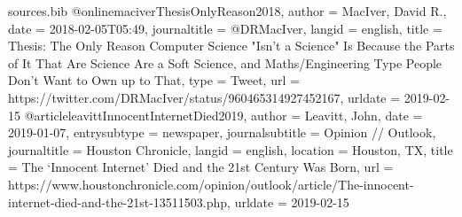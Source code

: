 %
%

\begin{filecontents}{sources.bib}
@online{maciverThesisOnlyReason2018,
  author = {MacIver, David R.},
  date = {2018-02-05T05:49},
  journaltitle = {@DRMacIver},
  langid = {english},
  title = {Thesis: The Only Reason {{Computer Science}} "Isn't a Science" Is Because the Parts of It That Are Science Are a Soft Science, and Maths/Engineering Type People Don't Want to Own up to That},
  type = {Tweet},
  url = {https://twitter.com/DRMacIver/status/960465314927452167},
  urldate = {2019-02-15}
}
@article{leavittInnocentInternetDied2019,
  author = {Leavitt, John},
  date = {2019-01-07},
  entrysubtype = {newspaper},
  journalsubtitle = {Opinion // Outlook},
  journaltitle = {Houston Chronicle},
  langid = {english},
  location = {{Houston, TX}},
  title = {The ‘Innocent Internet’ Died and the 21st Century Was Born},
  url = {https://www.houstonchronicle.com/opinion/outlook/article/The-innocent-internet-died-and-the-21st-13511503.php},
  urldate = {2019-02-15}
}
\end{filecontents}


\documentclass{article}

\usepackage[utf8]{inputenc}

\usepackage[strict=true]{csquotes}

\usepackage[
    backend=biber,
    bibencoding=utf8,
    style=chicago-authordate,
    urldate=iso,        %
    sorting=nyt,        %
]{biblatex}

